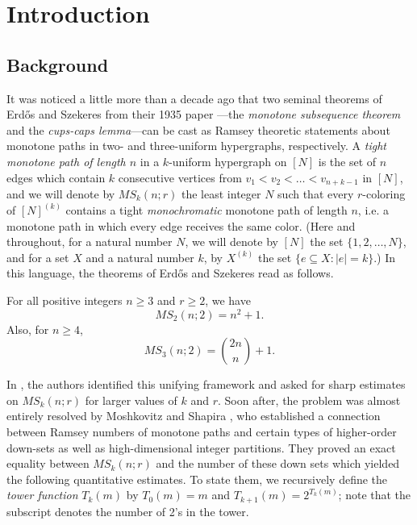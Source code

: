 \section{Introduction}

\subsection{Background}
It was noticed a little more than a decade ago \cite{EM13, FPSS12} that two seminal theorems of Erd\H{o}s and Szekeres from their 1935 paper \cite{ES35}---the \textit{monotone subsequence theorem} and the \textit{cups-caps lemma}---can be cast as Ramsey theoretic statements about monotone paths in two- and three-uniform hypergraphs, respectively.
A \textit{tight monotone path of length $n$} in a $k$-uniform hypergraph on $[N]$ is the set of $n$ edges which contain $k$ consecutive vertices from $v_1 < v_2 < \dots < v_{n+k-1}$ in $[N]$, and we will denote by $MS_k(n; r)$ the least integer $N$ such that every $r$-coloring of $[N]^{(k)}$ contains a tight \textit{monochromatic} monotone path of length $n$, i.e. a monotone path in which every edge receives the same color.
(Here and throughout, for a natural number $N$, we will denote by $[N]$ the set $\{1,2,\dots,N\}$, and for a set $X$ and a natural number $k$, by $X^{(k)}$ the set $\{e \subseteq X: |e| = k\}$.)
In this language, the theorems of Erd\H{o}s and Szekeres read as follows.

\begin{theorem}
    For all positive integers $n \geq 3$ and $r \geq 2$, we have
    \begin{equation*}
        MS_2(n; 2) = n^2 + 1.
    \end{equation*}
    Also, for $n \geq 4$,
    \begin{equation*}
        MS_3(n; 2) = \binom{2n}{n} + 1.
    \end{equation*}
\end{theorem}

In \cite{FPSS12}, the authors identified this unifying framework and asked for sharp estimates on $MS_k(n; r)$ for larger values of $k$ and $r$.
Soon after, the problem was almost entirely resolved by Moshkovitz and Shapira \cite{MS14}, who established a connection between Ramsey numbers of monotone paths and certain types of higher-order down-sets as well as high-dimensional integer partitions.
They proved an exact equality between $MS_k(n; r)$ and the number of these down sets which yielded the following quantitative estimates.
To state them, we recursively define the \textit{tower function} $T_k(m)$ by $T_0(m) = m$ and $T_{k+1}(m) = 2^{T_k(m)}$; note that the subscript denotes the number of 2's in the tower.

